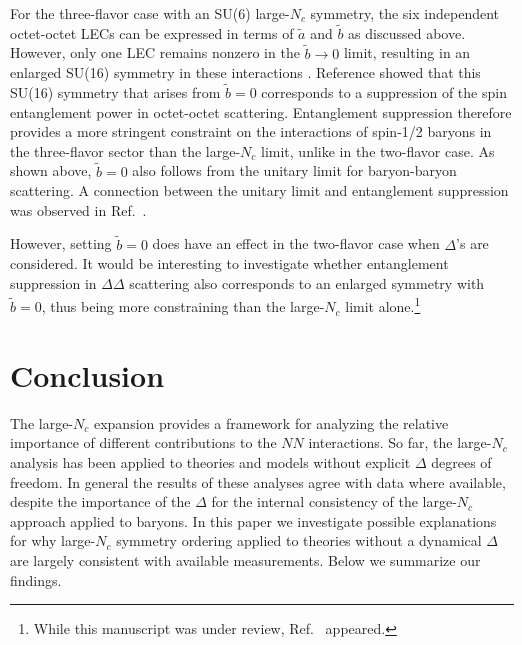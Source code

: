 \documentclass[nofootinbib, preprint, aps, prc, superscriptaddress,11pt]{revtex4-1}
\newcommand{\Nc}{\ensuremath{N_c}\xspace}
\newcommand{\NN}{\ensuremath{N\!N}\xspace}
\newcommand{\1}{\mathbbm{1}}
\newcommand{\at}{\ensuremath{\tilde{a}}\xspace}
\newcommand{\bt}{\ensuremath{\tilde{b}}\xspace}
\newcommand{\D}{\ensuremath{\Delta}\xspace}
\newcommand{\DD}{\ensuremath{\Delta\Delta}\xspace}
\begin{document}
For the three-flavor case with an SU(6) large-\Nc symmetry, the six independent octet-octet LECs \cite{Savage:1995kv} can be expressed in terms of \at and \bt as discussed above. 
However, only one LEC remains nonzero in the $\bt \to 0$ limit, resulting in an enlarged SU(16) symmetry in these interactions \cite{Kaplan:1995yg}. 
Reference \cite{Beane:2018oxh} showed that this SU(16) symmetry that arises from $\bt=0$ corresponds to a suppression of the spin entanglement power in octet-octet scattering.
Entanglement suppression therefore provides a more stringent constraint on the interactions of spin-1/2 baryons in the three-flavor sector than the large-\Nc limit, unlike in the two-flavor case. 
As shown above, $\bt=0$ also follows from the unitary limit for baryon-baryon scattering. A connection between the unitary limit and entanglement suppression was observed in Ref.~\cite{Beane:2018oxh}.

However, setting $\bt=0$ does have an effect in the two-flavor case when \D's are considered. 
It would be interesting to investigate whether entanglement suppression in \DD scattering also corresponds to an enlarged symmetry with $\bt=0$, thus being more constraining than the large-\Nc limit alone.\footnote{While this manuscript was under review, Ref.~\cite{Hu:2025lua} appeared.}




\section{Conclusion}

The large-\Nc expansion provides a framework for analyzing the relative importance of different contributions to the \NN interactions.
So far, the large-\Nc analysis has been applied to theories and models without explicit \D degrees of freedom.
In general the results of these analyses agree with data where available, despite the importance of the \D for the internal consistency of the large-\Nc approach applied to baryons.
In this paper we investigate possible explanations for why large-\Nc symmetry ordering applied to theories without a dynamical \D are largely consistent with available measurements.  Below we summarize our findings.
\end{document}

